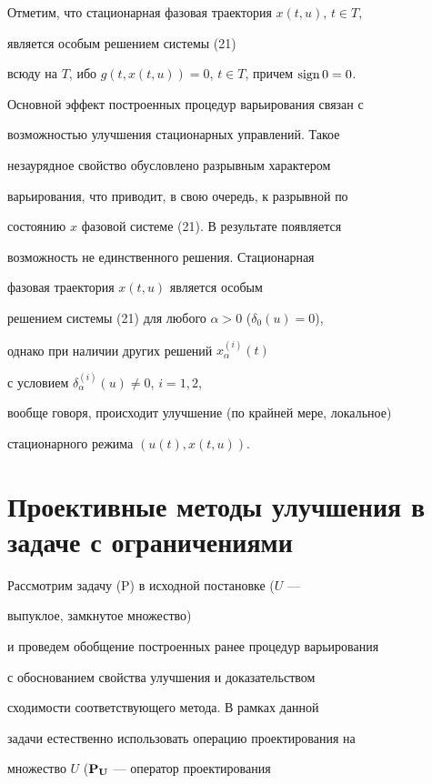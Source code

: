 Отметим, что стационарная фазовая траектория $x(t,u)$, $t\in T$,


является особым решением системы (21)


всюду на $T$, ибо $g(t,x(t,u))=0$, $t\in T$, причем $\operatorname{sign} 0=0$.





Основной эффект построенных процедур варьирования связан с 


возможностью улучшения стационарных управлений. Такое


незаурядное свойство обусловлено разрывным характером 


варьирования, что приводит, в свою очередь, к разрывной по


состоянию $x$ фазовой системе (21). В результате появляется 


возможность не единственного решения. Стационарная


фазовая траектория $ x(t,u)$ является особым 


решением системы (21) для любого $\alpha>0$ ($\delta_{0}(u)=0$),


однако при наличии других решений $x_{\alpha}^{(i)}(t)$


с условием $\delta_{\alpha}^{(i)}(u) \neq 0$, $i=1,2$,


вообще говоря, происходит улучшение (по крайней мере, локальное) 


стационарного режима $(u(t), x(t,u))$.








\section{Проективные методы улучшения в задаче с ограничениями}





Рассмотрим задачу (P) в исходной постановке ($U$ ---


выпуклое, замкнутое множество)


и проведем обобщение построенных ранее процедур варьирования 


с обоснованием свойства улучшения и доказательством


сходимости соответствующего метода. В рамках данной 


задачи естественно использовать операцию проектирования на


множество $U$ ($\bold{P}_{\bold U}$ --- оператор проектирования 


